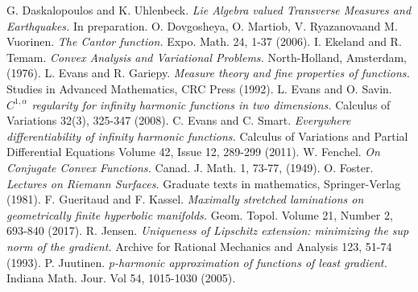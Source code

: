 \documentclass{ip-journal}
\theoremstyle{definition}
\numberwithin{equation}{section}
\begin{document}
\begin{thebibliography}{ABC}
 G. Daskalopoulos and K. Uhlenbeck. {\it Lie Algebra valued Transverse Measures and Earthquakes.} In preparation.
   O. Dovgosheya, O. Martiob, V. Ryazanovaand M. Vuorinen. {\it {The Cantor function.}} Expo. Math. 24,  1-37 (2006).
I. Ekeland and  R. Temam. {\it Convex Analysis and Variational Problems.} North-Holland, Amsterdam, (1976).
 L. Evans and R. Gariepy. {\it{Measure theory and fine properties of functions.}} Studies in Advanced Mathematics, CRC Press (1992).
 L. Evans and O. Savin. {\it $C^{1, \alpha}$ regularity for infinity harmonic functions in two dimensions.}
Calculus of Variations 32(3), 325-347 (2008).
 C. Evans and C. Smart. 
{\it Everywhere differentiability of infinity harmonic functions.} Calculus of Variations and Partial Differential Equations
Volume 42, Issue 12, 289-299 (2011).
 W. Fenchel. {\it On Conjugate Convex Functions.} Canad. J. Math. 1, 73-77, (1949).
 O. Foster. {\it Lectures on Riemann Surfaces.} Graduate texts in mathematics, Springer-Verlag (1981).
 F. Gueritaud and F. Kassel.
{\it Maximally stretched laminations on geometrically finite hyperbolic manifolds.} Geom. Topol. Volume 21, Number 2, 693-840 (2017).
 R. Jensen. {\it Uniqueness of Lipschitz extension: minimizing the sup norm of the gradient.} Archive for Rational Mechanics and Analysis 123, 51-74 (1993).
 P. Juutinen. {\it{p-harmonic approximation of functions of least gradient.}} Indiana  Math. Jour. Vol 54, 1015-1030 (2005).

\end{thebibliography}
\end{document}
